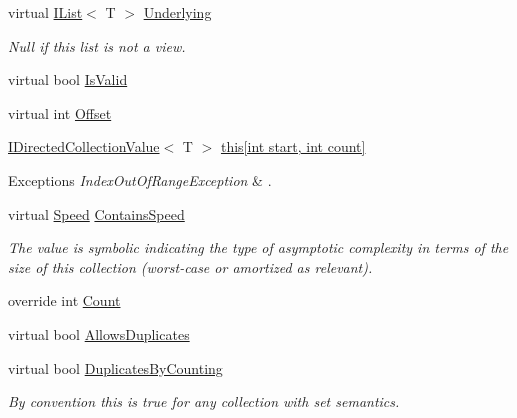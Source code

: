 \begin{DoxyCompactItemize}
\item 
virtual \hyperlink{interface_c5_1_1_i_list}{I\+List}$<$ T $>$ \hyperlink{class_c5_1_1_linked_list_ab397d6b593af94a4467462b2bd3bcf72}{Underlying}
\begin{DoxyCompactList}\small\item\em Null if this list is not a view. \end{DoxyCompactList}\item 
virtual bool \hyperlink{class_c5_1_1_linked_list_af53b6f41455420820708c503dd6c5038}{Is\+Valid}
\item 
virtual int \hyperlink{class_c5_1_1_linked_list_a2e5e6359550eee9b7bb49011c2d69aff}{Offset}
\item 
\hyperlink{interface_c5_1_1_i_directed_collection_value}{I\+Directed\+Collection\+Value}$<$ T $>$ \hyperlink{class_c5_1_1_linked_list_a97916a234fa4b65f2831365be182fb53}{this\mbox{[}int start, int count\mbox{]}}
\begin{DoxyCompactList}\small\item\em 
\begin{DoxyExceptions}{Exceptions}
{\em Index\+Out\+Of\+Range\+Exception} & . \\
\hline
\end{DoxyExceptions}
\end{DoxyCompactList}\item 
virtual \hyperlink{namespace_c5_a615ba88dcdaa8d5a3c5f833a73d7fad6}{Speed} \hyperlink{class_c5_1_1_linked_list_a176ab1eedbdc470f2eead863ce10b0d1}{Contains\+Speed}
\begin{DoxyCompactList}\small\item\em The value is symbolic indicating the type of asymptotic complexity in terms of the size of this collection (worst-\/case or amortized as relevant). \end{DoxyCompactList}\item 
override int \hyperlink{class_c5_1_1_linked_list_a52f3c3922d1c223482cf8071d7e1437d}{Count}
\item 
virtual bool \hyperlink{class_c5_1_1_linked_list_a07b967b548ad97faa21e20f323386152}{Allows\+Duplicates}
\item 
virtual bool \hyperlink{class_c5_1_1_linked_list_ad319faafaee30104fe18d6ab1484e126}{Duplicates\+By\+Counting}
\begin{DoxyCompactList}\small\item\em By convention this is true for any collection with set semantics. \end{DoxyCompactList}\end{DoxyCompactItemize}
